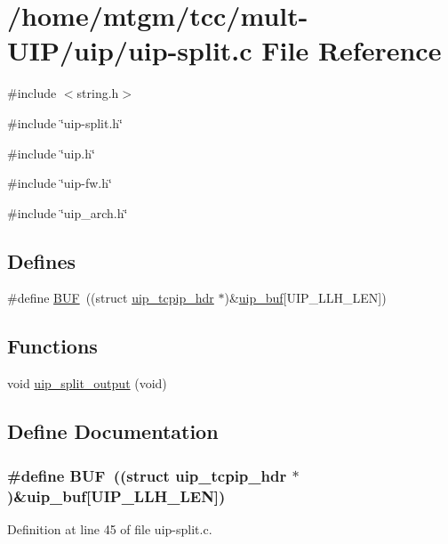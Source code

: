 \hypertarget{uip-split_8c}{
\section{/home/mtgm/tcc/mult-\/UIP/uip/uip-\/split.c File Reference}
\label{uip-split_8c}
}
{\ttfamily \#include $<$string.h$>$}\par
{\ttfamily \#include \char`\"{}uip-\/split.h\char`\"{}}\par
{\ttfamily \#include \char`\"{}uip.h\char`\"{}}\par
{\ttfamily \#include \char`\"{}uip-\/fw.h\char`\"{}}\par
{\ttfamily \#include \char`\"{}uip\_\-arch.h\char`\"{}}\par
\subsection*{Defines}
\begin{DoxyCompactItemize}
\item 
\#define \hyperlink{uip-split_8c_a24f52ac52d6e714cb04a5aa01be3bdd0}{BUF}~((struct \hyperlink{structuip__tcpip__hdr}{uip\_\-tcpip\_\-hdr} $\ast$)\&\hyperlink{group__uipdevfunc_gab81e78f890dbbee50c533a9734b74fd9}{uip\_\-buf}\mbox{[}UIP\_\-LLH\_\-LEN\mbox{]})
\end{DoxyCompactItemize}
\subsection*{Functions}
\begin{DoxyCompactItemize}
\item 
void \hyperlink{group__uipsplit_gab4b17aaf20d630f30919b19937b966a3}{uip\_\-split\_\-output} (void)
\end{DoxyCompactItemize}


\subsection{Define Documentation}
\hypertarget{uip-split_8c_a24f52ac52d6e714cb04a5aa01be3bdd0}{
\subsubsection[{BUF}]{\setlength{\rightskip}{0pt plus 5cm}\#define BUF~((struct {\bf uip\_\-tcpip\_\-hdr} $\ast$)\&{\bf uip\_\-buf}\mbox{[}UIP\_\-LLH\_\-LEN\mbox{]})}}
\label{uip-split_8c_a24f52ac52d6e714cb04a5aa01be3bdd0}


Definition at line 45 of file uip-\/split.c.

